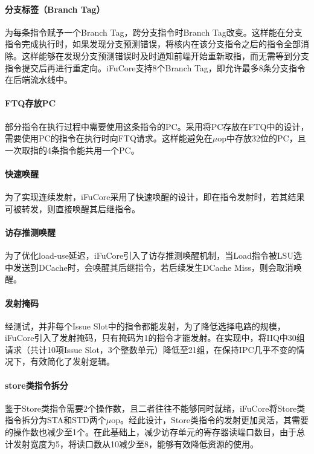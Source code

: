 \documentclass{article}
\begin{document}
\paragraph{分支标签（Branch Tag）}
为每条指令赋予一个Branch Tag，跨分支指令时Branch Tag改变。这样能在分支指令完成执行时，如果发现分支预测错误，将核内在该分支指令之后的指令全部消除。这样能够在发现分支预测错误时及时通知前端开始重新取指，而无需等到分支指令提交后再进行重定向。iFuCore支持8个Branch Tag，即允许最多8条分支指令在后端流水线中。\par
\paragraph{FTQ存放PC}
部分指令在执行过程中需要使用这条指令的PC。采用将PC存放在FTQ中的设计，需要使用PC的指令在执行时向FTQ请求。这样能避免在$\mu$op中存放32位的PC，且一次取指的4条指令能共用一个PC。\par
\paragraph{快速唤醒} 
为了实现连续发射，iFuCore采用了快速唤醒的设计，即在指令发射时，若其结果可被转发，则直接唤醒其后继指令。\par
\paragraph{访存推测唤醒} 
为了优化load-use延迟，iFuCore引入了访存推测唤醒机制，当Load指令被LSU选中发送到DCache时，会唤醒其后继指令，若后续发生DCache Miss，则会取消唤醒。\par
\paragraph{发射掩码} 
经测试，并非每个Issue Slot中的指令都能发射，为了降低选择电路的规模，iFuCore引入了发射掩码，只有掩码为1的指令才能发射。在实现中，将IIQ中30组请求（共计10项Issue Slot，3个整数单元）降低至21组，在保持IPC几乎不变的情况下，有效简化了发射逻辑。\par
\paragraph{store类指令拆分} 
鉴于Store类指令需要2个操作数，且二者往往不能够同时就绪，iFuCore将Store类指令拆分为STA和STD两个$\mu$op。经此设计，Store类指令的发射更加灵活，其需要的操作数也减少至1个。在此基础上，减少访存单元的寄存器读端口数目，由于总计发射宽度为5，将读口数从10减少至8，能够有效降低资源的使用。\par
\end{document}
